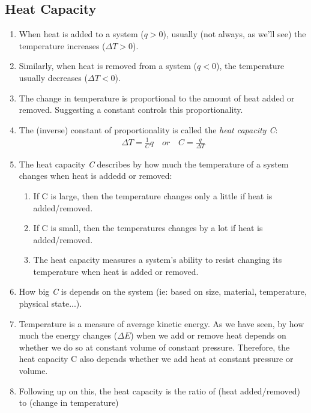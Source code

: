 \documentclass{article}  %
\begin{document}
\subsection*{Heat Capacity}
\begin{enumerate}
    \item When heat is added to a system ($q > 0$), usually (not always, as we'll see) the temperature increases ($\Delta T > 0$).
    \item Similarly, when heat is removed from a system ($q < 0$), the temperature usually decreases ($\Delta T < 0$).
    \item The change in temperature is proportional to the amount of heat added or removed. Suggesting a constant controls this proportionality.
    \item The (inverse) constant of proportionality is called the \emph{heat capacity C}:
        \begin{equation*}
            \begin{aligned}
                \Delta T = \frac{1}{C}q \quad or \quad C = \frac{q}{\Delta T}
            \end{aligned}
        \end{equation*}
    \item The heat capacity \emph{C} describes by how much the temperature of a system changes when heat is addedd or removed:
        \begin{enumerate}
            \item If C is large, then the temperature changes only a little if heat is added/removed.
            \item If C is small, then the temperatures changes by a lot if heat is added/removed.
            \item The heat capacity measures a system's ability to resist changing its temperature when heat is added or removed.
        \end{enumerate}
    \item How big \emph{C} is depends on the system (ie: based on size, material, temperature, physical state...).
    \item Temperature is a measure of average kinetic energy. As we have seen, by how much the energy changes ($\Delta E$) when we add or remove heat depends on whether we do so at constant volume of constant pressure. Therefore, the heat capacity C also depends whether we add heat at constant pressure or volume.
    \item Following up on this, the heat capacity is the ratio of (heat added/removed) to (change in temperature)

\end{enumerate}
\end{document}
